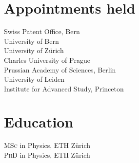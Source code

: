 \documentclass[11pt]{article} %
\begin{document}
\section*{Appointments held}

Swiss Patent Office, Bern\\
University of Bern\\
University of Zürich\\
Charles University of Prague\\
Prussian Academy of Sciences, Berlin\\
University of Leiden\\
Institute for Advanced Study, Princeton


\section*{Education}

\textsc{MSc} in Physics, ETH Zürich\\
\textsc{PhD} in Physics, ETH Zürich

\end{document}
